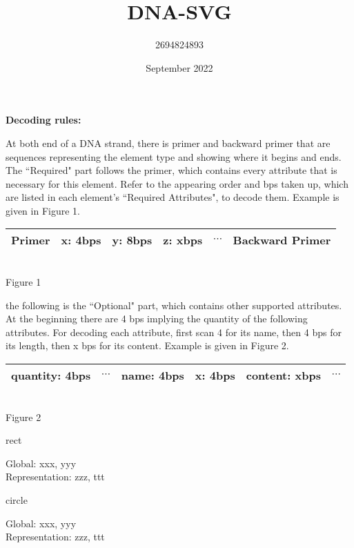 \documentclass{article}
\title{DNA-SVG}
\author{2694824893 }
\date{September 2022}
\begin{document}
\maketitle
\noindent
{\fontsize{12pt}{14.4pt}\textbf{Decoding rules:}}
\par At both end of a DNA strand, there is primer and backward primer that are sequences representing the element type and showing where it begins and ends. The ``Required" part follows the primer, which contains every attribute that is necessary for this element. Refer to the appearing order and bps taken up, which are listed in each element's ``Required Attributes", to decode them. Example is given in Figure 1. 
\begin{center}
    \begin{tabular}{c|c|c|c|c|c}
        \hline 
        Primer & x: 4bps & y: 8bps & z: xbps & $\cdots$ & Backward Primer\\
        \hline
    \end{tabular}\\[4pt]
    Figure 1
\end{center}
\par the following is the ``Optional" part, which contains other supported attributes. At the beginning there are 4 bps implying the quantity of the following attributes. For decoding each attribute, first scan 4 for its name, then 4 bps for its length, then x bps for its content. Example is given in Figure 2.
\begin{center}
    \begin{tabular}{c|c|c|c|c|c}
        \hline 
        quantity: 4bps & $\cdots$ & name: 4bps & x: 4bps & content: xbps & $\cdots$ \\
        \hline
    \end{tabular}\\[4pt]
    Figure 2
\end{center}
\begin{Element}{rect}
    \begin{Required}
    \end{Required}
    \begin{Optional}
        Global: xxx, yyy\\
        Representation: zzz, ttt
    \end{Optional}
\end{Element}
\begin{Element}{circle}
    \begin{Required}
    \end{Required}
    \begin{Optional}
        Global: xxx, yyy\\
        Representation: zzz, ttt
    \end{Optional}
\end{Element}
\end{document}
